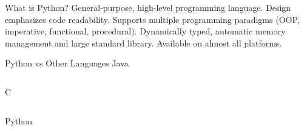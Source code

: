 \documentclass[aspectratio=169]{beamer}
\begin{document}
    \begin{frame}{What is Python?}
        General-purpose, high-level programming language.\newline
        \newline
        Design emphasizes code readability.\newline
        \newline
        Supports multiple programming paradigms (OOP, imperative, functional, procedural).\newline
        \newline
        Dynamically typed, automatic memory management and large standard library.\newline
        \newline
        Available on almost all platforms.

    \end{frame}

    \begin{frame}{Python vs Other Languages}
        \footnotesize
        Java
        \inputminted{java}{code/9_hello_world.java}
        C
        \inputminted{c}{code/9_hello_world.c}
        Python
        \inputminted{python}{code/9_hello_world.py}

    \end{frame}
\end{document}
